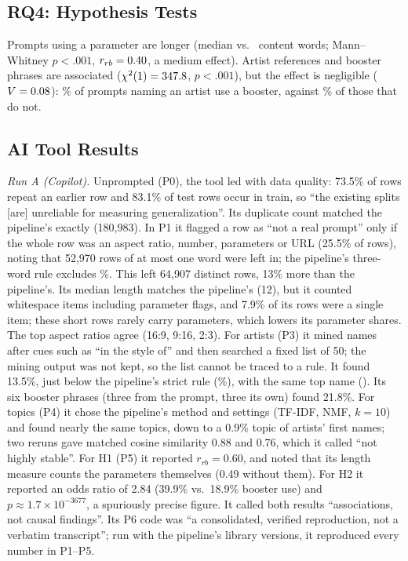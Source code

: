 \documentclass[conference]{IEEEtran}
\begin{document}
\begin{table}[t]
\centering
\caption{NMF topics: share of prompts, stability $J$, top words.}
\label{tab:topics}
\small

\end{table}

\subsection{RQ4: Hypothesis Tests}
Prompts using a parameter are longer (median \MedianWordsParam{} vs.\ \MedianWordsNoParam{} content words;
Mann--Whitney $p<.001$, $r_{rb}=0.40$, a medium effect).
Artist references and booster phrases are associated ($\chi^2(1)=347.8$,
$p<.001$), but the effect is negligible ($V=0.08$): \PctBoostIfArtist\% of
prompts naming an artist use a booster, against \PctBoostIfNoArtist\% of those
that do not.

\subsection{AI Tool Results}
\textit{Run A (Copilot).} Unprompted (P0), the tool led with data quality:
73.5\% of rows repeat an earlier row and 83.1\% of test rows occur in train,
so ``the existing splits [are] unreliable for measuring generalization''.
Its duplicate count matched the pipeline's exactly (180,983). In P1 it flagged a row
as ``not a real prompt'' only if the whole row was an aspect ratio, number,
parameters or URL (25.5\% of rows), noting that 52,970 rows of at most one
word were left in; the pipeline's three-word rule excludes \PctNonPrompt\%. This left
64,907 distinct rows, 13\% more than the pipeline's. Its median length matches the pipeline's (12), but it counted whitespace items including parameter flags, and 7.9\%
of its rows were a single item; these short rows rarely carry parameters,
which lowers its parameter shares. The top aspect ratios agree (16:9, 9:16,
2:3). For artists (P3) it mined names after cues such as ``in the style
of'' and then searched a fixed list of 50; the mining output was not kept,
so the list cannot be traced to a rule. It found 13.5\%, just below the pipeline's strict rule (\PctArtistStrict\%),
with the same top name (\TopArtistOne). Its six booster phrases
(three from the prompt, three its own) found 21.8\%. For topics (P4) it chose the pipeline's method and settings (TF-IDF, NMF, $k=10$) and
found nearly the same topics, down to a 0.9\% topic of artists' first names; two reruns gave
matched cosine similarity 0.88 and 0.76, which it called ``not highly
stable''. For H1 (P5) it reported $r_{rb}=0.60$, and noted that its length
measure counts the parameters themselves (0.49 without them). For H2 it
reported an odds ratio of 2.84 (39.9\% vs.\ 18.9\% booster use) and
$p\approx1.7\times10^{-3677}$, a spuriously precise figure. It called both
results ``associations, not causal findings''. Its P6 code was ``a
consolidated, verified reproduction, not a verbatim transcript''; run with the pipeline's library versions, it reproduced every number in
P1--P5.
\end{document}
